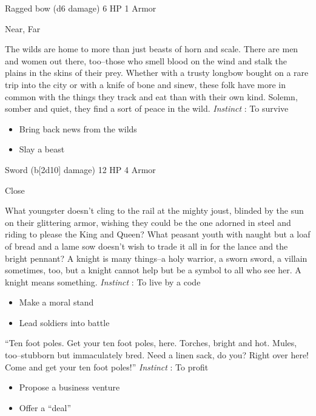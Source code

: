 

 Ragged bow (d6 damage) 6 HP 1 Armor


 Near, Far


 The wilds are home to more than just beasts of horn and scale. There are men and women out there, too--those who smell blood on the wind and stalk the plains in the skins of their prey. Whether with a trusty longbow bought on a rare trip into the city or with a knife of bone and sinew, these folk have more in common with the things they track and eat than with their own kind. Solemn, somber and quiet, they find a sort of peace in the wild. \emph{Instinct}
: To survive
\begin{itemize}
\item Bring back news from the wilds
\item Slay a beast

\end{itemize}




 Sword (b[2d10] damage) 12 HP 4 Armor


 Close


 What youngster doesn't cling to the rail at the mighty joust, blinded by the sun on their glittering armor, wishing they could be the one adorned in steel and riding to please the King and Queen? What peasant youth with naught but a loaf of bread and a lame sow doesn't wish to trade it all in for the lance and the bright pennant? A knight is many things--a holy warrior, a sworn sword, a villain sometimes, too, but a knight cannot help but be a symbol to all who see her. A knight means something. \emph{Instinct}
: To live by a code
\begin{itemize}
\item Make a moral stand
\item Lead soldiers into battle

\end{itemize}




 ``Ten foot poles. Get your ten foot poles, here. Torches, bright and hot. Mules, too--stubborn but immaculately bred. Need a linen sack, do you? Right over here! Come and get your ten foot poles!'' \emph{Instinct}
: To profit
\begin{itemize}
\item Propose a business venture
\item Offer a ``deal''

\end{itemize}


